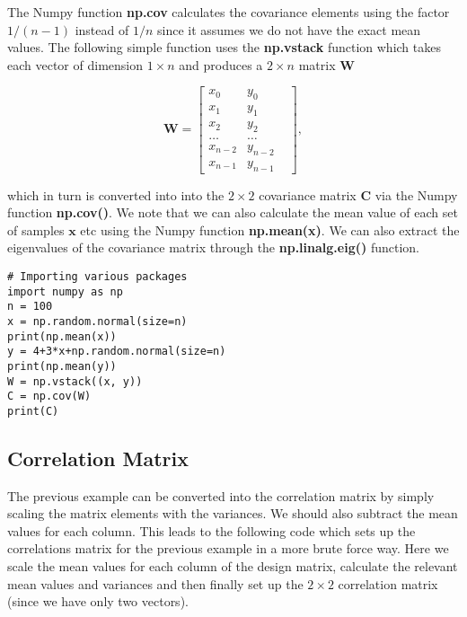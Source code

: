 \documentclass[%
oneside,                 %
final,                   %
10pt]{article}
\begin{document}
The Numpy function \textbf{np.cov} calculates the covariance elements using
the factor $1/(n-1)$ instead of $1/n$ since it assumes we do not have
the exact mean values.  The following simple function uses the
\textbf{np.vstack} function which takes each vector of dimension $1\times n$
and produces a $2\times n$ matrix $\bm{W}$


\[
\bm{W} = \begin{bmatrix} x_0 & y_0 \\
                          x_1 & y_1 \\
                          x_2 & y_2\\
                          \dots & \dots \\
                          x_{n-2} & y_{n-2}\\
                          x_{n-1} & y_{n-1} & 
             \end{bmatrix},
\]

which in turn is converted into into the $2\times 2$ covariance matrix
$\bm{C}$ via the Numpy function \textbf{np.cov()}. We note that we can also calculate
the mean value of each set of samples $\bm{x}$ etc using the Numpy
function \textbf{np.mean(x)}. We can also extract the eigenvalues of the
covariance matrix through the \textbf{np.linalg.eig()} function.

\begin{verbatim}
# Importing various packages
import numpy as np
n = 100
x = np.random.normal(size=n)
print(np.mean(x))
y = 4+3*x+np.random.normal(size=n)
print(np.mean(y))
W = np.vstack((x, y))
C = np.cov(W)
print(C)
\end{verbatim}

\subsection*{Correlation Matrix}

The previous example can be converted into the correlation matrix by
simply scaling the matrix elements with the variances.  We should also
subtract the mean values for each column. This leads to the following
code which sets up the correlations matrix for the previous example in
a more brute force way. Here we scale the mean values for each column of the design matrix, calculate the relevant mean values and variances and then finally set up the $2\times 2$ correlation matrix (since we have only two vectors). 
\end{document}
